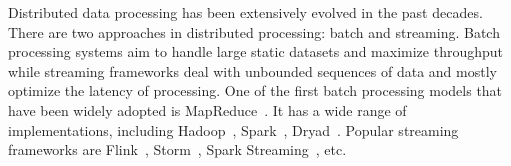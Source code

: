 
Distributed data processing has been extensively evolved in the past decades. There are two approaches in distributed processing: batch and streaming. Batch processing systems aim to handle large static datasets and maximize throughput while streaming frameworks deal with unbounded sequences of data and mostly optimize the latency of processing. One of the first batch processing models that have been widely adopted is MapReduce~\cite{Dean:2008:MSD:1327452.1327492}. It has a wide range of implementations, including Hadoop~\cite{hadoop2009hadoop}, Spark~\cite{Zaharia:2016:ASU:3013530.2934664}, Dryad~\cite{Isard:2007:DDD:1272996.1273005}. Popular streaming frameworks are Flink~\cite{carbone2015apache}, Storm~\cite{Toshniwal:2014:STO:2588555.2595641}, Spark Streaming~\cite{Zaharia:2012:DSE:2342763.2342773}, etc.

